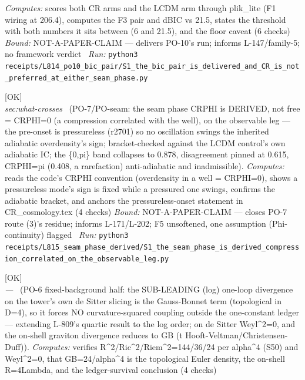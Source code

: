 \begin{description}
\emph{Computes:} scores both CR arms and the LCDM arm through plik\_lite (F1 wiring at 206.4), computes the F3 pair and dBIC vs 21.5, states the threshold with both numbers it sits between (6 and 21.5), and the floor caveat (6 checks)
 \emph{Bound:} NOT-A-PAPER-CLAIM --- delivers PO-10's run; informs L-147/family-5; no framework verdict
\ \emph{Run:} \texttt{python3 receipts/L814\_po10\_bic\_pair/S1\_the\_bic\_pair\_is\_delivered\_and\_CR\_is\_not\_preferred\_at\_either\_seam\_phase.py}
\item[\label{rcpt:S1_the_seam_phase_is_derived_compression_correlated_on_the_observable_leg}\texttt{S1\_the\_seam\_phase\_is\_derived\_compression\_correlated\_on\_the\_observable\_leg}]\hfill\textsf{[OK]}\\
\textit{sec:what-crosses} \ (PO-7/PO-seam: the seam phase CRPHI is DERIVED, not free = CRPHI=0 (a compression correlated with the well), on the observable leg --- the pre-onset is pressureless (r2701) so no oscillation swings the inherited adiabatic overdensity's sign; bracket-checked against the LCDM control's own adiabatic IC; the \{0,pi\} band collapses to 0.878, disagreement pinned at 0.615, CRPHI=pi (0.408, a rarefaction) anti-adiabatic and inadmissible). 
\emph{Computes:} reads the code's CRPHI convention (overdensity in a well = CRPHI=0), shows a pressureless mode's sign is fixed while a pressured one swings, confirms the adiabatic bracket, and anchors the pressureless-onset statement in CR\_cosmology.tex (4 checks)
 \emph{Bound:} NOT-A-PAPER-CLAIM --- closes PO-7 route (3)'s residue; informs L-171/L-202; F5 unsoftened, one assumption (Phi-continuity) flagged
\ \emph{Run:} \texttt{python3 receipts/L815\_seam\_phase\_derived/S1\_the\_seam\_phase\_is\_derived\_compression\_correlated\_on\_the\_observable\_leg.py}
\item[\label{rcpt:S1_the_subleading_log_divergence_is_gauss_bonnet_and_the_ledger_survives}\texttt{S1\_the\_subleading\_log\_divergence\_is\_gauss\_bonnet\_and\_the\_ledger\_survives}]\hfill\textsf{[OK]}\\
\textit{---} \ (PO-6 fixed-background half: the SUB-LEADING (log) one-loop divergence on the tower's own de Sitter slicing is the Gauss-Bonnet term (topological in D=4), so it forces NO curvature-squared coupling outside the one-constant ledger --- extending L-809's quartic result to the log order; on de Sitter Weyl\textasciicircum{}2=0, and the on-shell graviton divergence reduces to GB (t Hooft-Veltman/Christensen-Duff)). 
\emph{Computes:} verifies R\textasciicircum{}2/Ric\textasciicircum{}2/Riem\textasciicircum{}2=144/36/24 per alpha\textasciicircum{}4 (S50) and Weyl\textasciicircum{}2=0, that GB=24/alpha\textasciicircum{}4 is the topological Euler density, the on-shell R=4Lambda, and the ledger-survival conclusion (4 checks)

\end{description}
